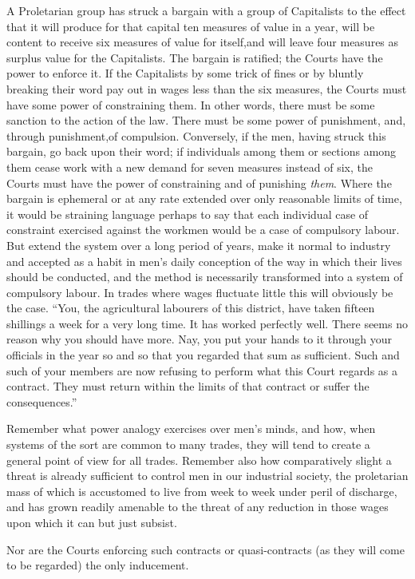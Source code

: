 \documentclass{book}
\begin{document}
A Proletarian group has struck a bargain with a group of Capitalists to the effect that it will produce for that capital ten measures of value in a year, will be content to receive six measures of value for itself,and will leave four measures as surplus value for the Capitalists. The bargain is ratified; the Courts have the power to enforce it. If the Capitalists by some trick of fines or by bluntly breaking their word pay out in wages less than the six measures, the Courts must have some power of constraining them. In other words, there must be some sanction to the action of the law. There must be some power of punishment, and, through punishment,of compulsion. Conversely, if the men, having struck this bargain, go back upon their word; if individuals among them or sections among them cease work with a new demand for seven measures instead of six, the Courts must have the power of constraining and of punishing \emph{them}. Where the bargain is ephemeral or at any rate extended over only reasonable limits of time, it would be straining language perhaps to say that each individual case of constraint exercised against the workmen would be a case of compulsory labour. But extend the system over a long period of years, make it normal to industry and accepted as a habit in men’s daily conception of the way in which their lives should be conducted, and the method is necessarily transformed into a system of compulsory labour. In trades where wages fluctuate little this will obviously be the case. “You, the agricultural labourers of this district, have taken fifteen shillings a week for a very long time. It has worked perfectly well. There seems no reason why you should have more. Nay, you put your hands to it through your officials in the year so and so that you regarded that sum as sufficient. Such and such of your members are now refusing to perform what this Court regards as a contract. They must return within the limits of that contract or suffer the consequences.”

Remember what power analogy exercises over men’s minds, and how, when systems of the sort are common to many trades, they will tend to create a general point of view for all trades. Remember also how comparatively slight a threat is already sufficient to control men in our industrial society, the proletarian mass of which is accustomed to live from week to week under peril of discharge, and has grown readily amenable to the threat of any reduction in those wages upon which it can but just subsist.

Nor are the Courts enforcing such contracts or quasi-contracts (as they will come to be regarded) the only inducement.
\end{document}
